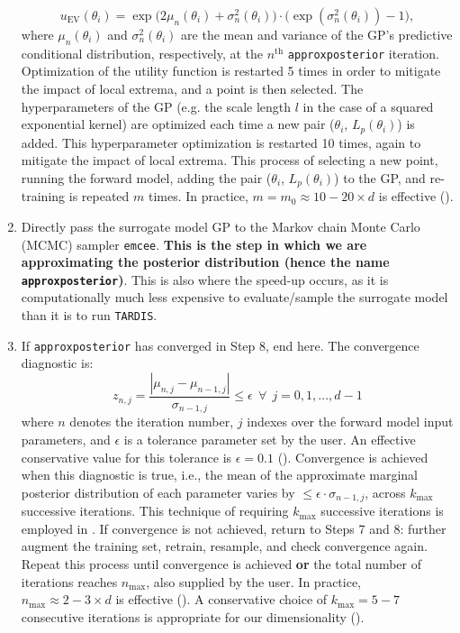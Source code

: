\documentclass[twocolumn]{aastex63}
\begin{document}
\begin{enumerate}
    \begin{equation}
    u_{\mathrm{EV}}(\theta_i) = \exp\big(2\mu_n(\theta_i) + \sigma_n^2(\theta_i)\big)\cdot\big(\exp(\sigma_n^2(\theta_i)) - 1\big),
    \end{equation} 
    where $\mu_n(\theta_i)$ and $\sigma_n^2(\theta_i)$ are the mean and variance of the GP's predictive conditional distribution, respectively, at the $n^{\mathrm{th}}$ \texttt{approxposterior} iteration. Optimization of the utility function is restarted 5 times in order to mitigate the impact of local extrema, and a point is then selected. The hyperparameters of the GP (e.g. the scale length $l$ in the case of a squared exponential kernel) are optimized each time a new pair ($\theta_i$, $L_p (\theta_i)$) is added. This hyperparameter optimization is restarted 10 times, again to mitigate the impact of local extrema. This process of selecting a new point, running the forward model, adding the pair ($\theta_i$, $L_p (\theta_i)$) to the GP, and re-training is repeated $m$ times. In practice, $m = m_0 \approx 10-20 \times d$ is effective (\citealt{fleming20}).
    \item Directly pass the surrogate model GP to the Markov chain Monte Carlo (MCMC) sampler \texttt{emcee}. \textbf{This is the step in which we are approximating the posterior distribution (hence the name \texttt{approxposterior})}. This is also where the speed-up occurs, as it is computationally much less expensive to evaluate/sample the surrogate model than it is to run \texttt{TARDIS}. 
    \item If \texttt{approxposterior} has converged in Step 8, end here. The convergence diagnostic is: 
    \begin{equation}
    z_{n, j} = \frac{|\mu_{n, j} - \mu_{n-1, j}|}{\sigma_{n-1, j}} \leqslant \epsilon~~\forall~~j=0,1,...,d-1 
    \end{equation}
    where $n$ denotes the iteration number, $j$ indexes over the forward model input parameters, and $\epsilon$ is a tolerance parameter set by the user. An effective conservative value for this tolerance is $\epsilon=0.1$ (\citealt{fleming20}). Convergence is achieved when this diagnostic is true, i.e., the mean of the approximate marginal posterior distribution of each parameter varies by $\leqslant\epsilon\cdot\sigma_{n-1, j}$, across $k_{\mathrm{max}}$ successive iterations. This technique of requiring $k_{\mathrm{max}}$ successive iterations is employed in \cite{wang18}. If convergence is not achieved, return to Steps 7 and 8: further augment the training set, retrain, resample, and check convergence again. Repeat this process until convergence is achieved \textbf{or} the total number of iterations reaches $n_{\mathrm{max}}$, also supplied by the user. In practice, $n_{\mathrm{max}} \approx 2-3 \times d$ is effective (\citealt{fleming20}). A conservative choice of $k_{\mathrm{max}}=5-7$ consecutive iterations is appropriate for our dimensionality (\citealt{fleming20}).

\end{enumerate}
\end{document}
